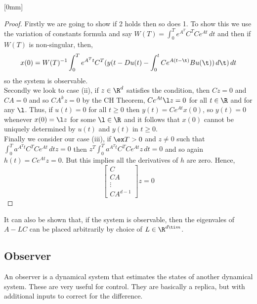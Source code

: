 
[0mm]
\begin{proof}
  Firstly we are going to show if 2 holds then so does 1. To show this we use the variation of constants formula and say $W(T) = \int_0^T e^{A^T}C^TCe^{At}\,dt$ and then if $W(T)$ is non-singular, then,
  $$ x(0) = W(T)^{-1}\int_0^T e^{A^Tt}C^T(y(t - Du(t) - \int_0^t Ce^{A(t-\t)}Bu(\t))\,d\t)\,dt $$
  so the system is observable.\\

  Secondly we look to case (ii), if $z \in \R^d$ satisfies the condition, then $Cz = 0$ and $CA = 0$ and so $CA^kz = 0$ by the CH Theorem, $Ce^{At}\l z = 0$ for all $t \in \R$ and for any $\l$. Thus, if $u(t) = 0$ for all $t \ge 0$ then $y(t) = Ce^{At} x(0)$, so $y(t) = 0$ whenever $x(0) = \l z$ for some $\l \in \R$ and it follows that $x(0)$ cannot be uniquely determined by $u(t)$ and $y(t)$ in $t \ge 0$.\\

  Finally we consider our case (iii), if $\ex T > 0$ and $z \ne 0$ such that $\int_0^T a^{A^Tt}C^TCe^{At}\,dtz = 0$ then $z^T\int_0^T a^{A^Tt}C^TCe^{At}z\,dt = 0$ and so again $h(t) = Ce^{At}z = 0$. But this implies all the derivatives of $h$ are zero. Hence,
  $$ \begin{bmatrix}
    C \\ CA \\ \vdots \\ CA^{d-1}
  \end{bmatrix}z = 0 $$
\end{proof}

\begin{remark}
   It can also be shown that, if the system is observable, then the eigenvales of $A - LC$ can be placed arbitrarily by choice of $L \in \R^{d \ti m}$.
\end{remark}

\subsection{Observer}
An observer is a dynamical system that estimates the states of another dynamical system. These are very useful for control. They are basically a replica, but with additional inputs to correct for the difference.\\

